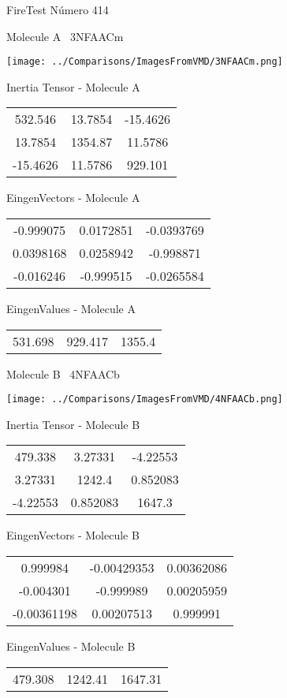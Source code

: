 \vtab[-3cm]
\begin{center}
{\large FireTest \tab Número 414}
\end{center}
\begin{multicols}{2}
\begin{center}

Molecule A \
3NFAACm

\texttt{[image: ../Comparisons/ImagesFromVMD/3NFAACm.png]}

Inertia Tensor - Molecule A \\
\begin{tabular}{|c c c|}
532.546	 & 	13.7854	 & 	-15.4626	 \\
13.7854	 & 	1354.87	 & 	11.5786	 \\
-15.4626	 & 	11.5786	 & 	929.101
\end{tabular}

\vtab
 EingenVectors - Molecule A     \\
\begin{tabular}{|c c c|}
-0.999075	 & 	0.0172851	 & 	-0.0393769	 \\
0.0398168	 & 	0.0258942	 & 	-0.998871	 \\
-0.016246	 & 	-0.999515	 & 	-0.0265584
\end{tabular}

\vtab
 EingenValues - Molecule A     \\
\begin{tabular}{|c c c|}
531.698	 & 	929.417	 & 	1355.4	 \\
\end{tabular}
\columnbreak

Molecule B \
4NFAACb

\texttt{[image: ../Comparisons/ImagesFromVMD/4NFAACb.png]}

Inertia Tensor - Molecule B \\
\begin{tabular}{|c c c|}
479.338	 & 	3.27331	 & 	-4.22553	 \\
3.27331	 & 	1242.4	 & 	0.852083	 \\
-4.22553	 & 	0.852083	 & 	1647.3
\end{tabular}

\vtab
 EingenVectors - Molecule B     \\
\begin{tabular}{|c c c|}
0.999984	 & 	-0.00429353	 & 	0.00362086	 \\
-0.004301	 & 	-0.999989	 & 	0.00205959	 \\
-0.00361198	 & 	0.00207513	 & 	0.999991
\end{tabular}

\vtab
 EingenValues - Molecule B     \\
\begin{tabular}{|c c c|}
479.308	 & 	1242.41	 & 	1647.31	 \\
\end{tabular}

\end{center}
\end{multicols}

